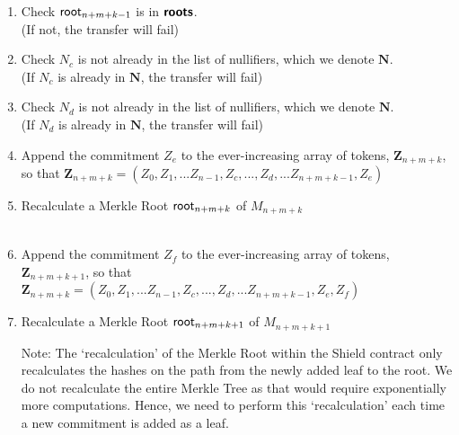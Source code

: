 \begin{enumerate}
  \item Check $\mathsf{root}_{n+m+k-1}$ is in $\bm{\mathsf{roots}}$.\\
    (If not, the transfer will fail)
  \item Check $N_c$ is not already in the list of nullifiers, which we denote $\bm{N}$.\\
    (If $N_c$ is already in $\bm{N}$, the transfer will fail)
  \item Check $N_d$ is not already in the list of nullifiers, which we denote $\bm{N}$.\\
  (If $N_d$ is already in $\bm{N}$, the transfer will fail)
  \item Append the commitment $Z_e$ to the ever-increasing array of tokens, $\bm{Z}_{n+m+k}$, so that $\bm{Z}_{n+m+k}=(Z_0, Z_1, ... Z_{n-1}, Z_c, ..., Z_d,... Z_{n+m+k-1}, Z_e)$\\
  \item Recalculate a Merkle Root $\mathsf{root}_{n+m+k}$ of $M_{n+m+k}$\\
    \\
  \item Append the commitment $Z_f$ to the ever-increasing array of tokens, $\bm{Z}_{n+m+k+1}$, so that $\bm{Z}_{n+m+k}=(Z_0, Z_1, ... Z_{n-1}, Z_c, ..., Z_d,... Z_{n+m+k-1}, Z_e, Z_f)$\\
  \item Recalculate a Merkle Root $\mathsf{root}_{n+m+k+1}$ of $M_{n+m+k+1}$
    
    Note: The `recalculation' of the Merkle Root within the Shield contract only recalculates the hashes on the path from the newly added leaf to the root. We do not recalculate the entire Merkle Tree as that would require exponentially more computations. Hence, we need to perform this `recalculation' each time a new commitment is added as a leaf.


\end{enumerate}
